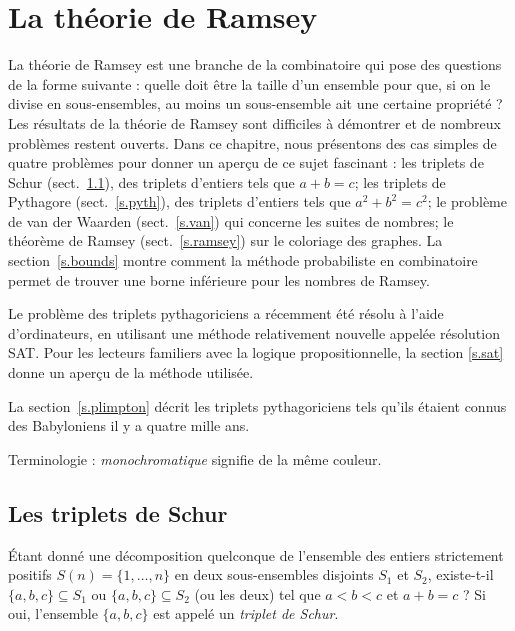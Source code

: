 \chapter{La théorie de Ramsey}\label{c.ramsey}




La théorie de Ramsey est une branche de la combinatoire qui pose des questions de la forme suivante : quelle doit être la taille d'un ensemble pour que, si on le divise en sous-ensembles, au moins un sous-ensemble ait une certaine propriété ?
Les résultats de la théorie de Ramsey sont difficiles à démontrer et de nombreux problèmes restent ouverts. Dans ce chapitre, nous présentons des cas simples de quatre problèmes pour donner un aperçu de ce sujet fascinant : les triplets de Schur (sect.~\ref{s.schur}), des triplets d'entiers tels que $a+b=c$; les triplets de Pythagore (sect.~\ref{s.pyth}), des triplets d'entiers tels que $a^2+b^2=c^2$; le problème de van der Waarden (sect.~\ref{s.van}) qui concerne les suites de nombres; le théorème de Ramsey (sect.~\ref{s.ramsey}) sur le coloriage des graphes. La section~\ref{s.bounds} montre comment la méthode probabiliste en combinatoire permet de trouver une borne inférieure pour les nombres de Ramsey.

Le problème des triplets pythagoriciens a récemment été résolu à l'aide d'ordinateurs, en utilisant une méthode relativement nouvelle appelée résolution SAT. Pour les lecteurs familiers avec la logique propositionnelle, la section \ref{s.sat} donne un aperçu de la méthode utilisée.

La section~\ref{s.plimpton} décrit les triplets pythagoriciens tels qu'ils étaient connus des Babyloniens il y a quatre mille ans.

Terminologie : \emph{monochromatique} signifie de la même couleur.



\section{Les triplets de Schur}\label{s.schur}


\begin{definition}
Étant donné une décomposition quelconque de l'ensemble des entiers strictement positifs  
$S(n)=\{1,\ldots,n\}$ 
en deux sous-ensembles disjoints $S_1$ et $S_2$, existe-t-il $\{a,b,c\}\subseteq  S_1$ ou $\{a,b,c\}\subseteq S_2$ (ou les deux) tel que $a\!<\!b\!<\!c$ et $a+b=c$ ? Si oui, l'ensemble $\{a,b,c\}$ est appelé un \emph{triplet de Schur}.
\end{definition}


